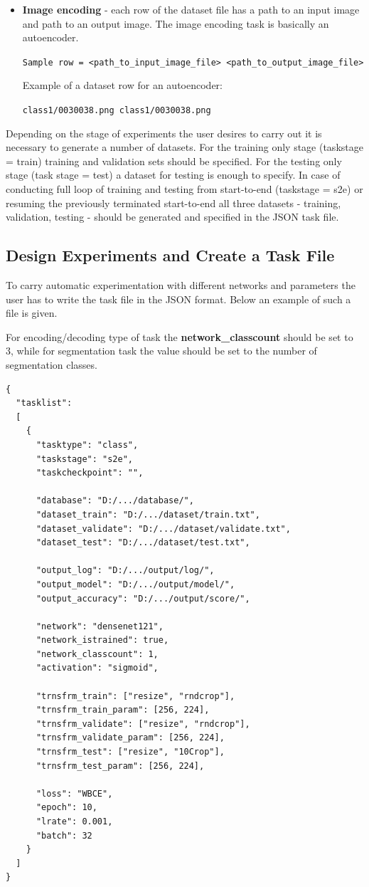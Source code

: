 \documentclass[a4paper, 11pt]{article}
\begin{document}
\begin{itemize}
\item \textbf{Image encoding} - each row of the dataset file has a path to an input image and path to an output image. The image encoding task is basically an autoencoder.

\texttt{Sample row = <path\_to\_input\_image\_file> <path\_to\_output\_image\_file>}

Example of a dataset row for an autoencoder:

\texttt{class1/0030038.png class1/0030038.png}

\end{itemize}

Depending on the stage of experiments the user desires to carry out it is necessary to generate a number of datasets. For the training only stage (taskstage = train) training and validation sets should be specified. For the testing only stage (task stage = test) a dataset for testing is enough to specify. In case of conducting full loop of training and testing from start-to-end (taskstage = s2e) or resuming the previously terminated start-to-end all three datasets - training, validation, testing - should be generated and specified in the JSON task file.

\subsection{Design Experiments and Create a Task File}
To carry automatic experimentation with different networks and parameters the user has to write the task file in the JSON format. Below an example of such a file is given.

For encoding/decoding type of task the \textbf{network\_classcount} should be set to 3, while for segmentation task the value should be set to the number of segmentation classes.

\begin{verbatim}
{
  "tasklist":
  [
    {
      "tasktype": "class",
      "taskstage": "s2e",
      "taskcheckpoint": "",

      "database": "D:/.../database/",
      "dataset_train": "D:/.../dataset/train.txt",
      "dataset_validate": "D:/.../dataset/validate.txt",
      "dataset_test": "D:/.../dataset/test.txt",

      "output_log": "D:/.../output/log/",
      "output_model": "D:/.../output/model/",
      "output_accuracy": "D:/.../output/score/",

      "network": "densenet121",
      "network_istrained": true,
      "network_classcount": 1,
      "activation": "sigmoid",

      "trnsfrm_train": ["resize", "rndcrop"],
      "trnsfrm_train_param": [256, 224],
      "trnsfrm_validate": ["resize", "rndcrop"],
      "trnsfrm_validate_param": [256, 224],
      "trnsfrm_test": ["resize", "10Crop"],
      "trnsfrm_test_param": [256, 224],

      "loss": "WBCE",
      "epoch": 10,
      "lrate": 0.001,
      "batch": 32
    }
  ]
}
\end{verbatim}
\end{document}
